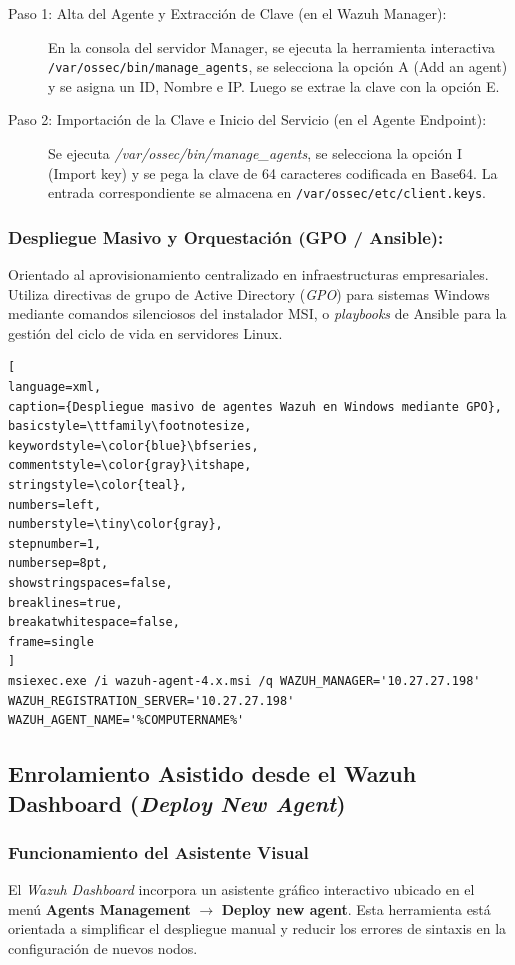 \begin{description}
\item[Paso 1: Alta del Agente y Extracción de Clave (en el Wazuh Manager):] En la consola del servidor Manager, se ejecuta la herramienta interactiva \texttt{/var/ossec/bin/manage\_agents}, se selecciona la opción A (Add an agent) y se asigna un ID, Nombre e IP. Luego se extrae la clave con la opción E.
\item[Paso 2: Importación de la Clave e Inicio del Servicio (en el Agente Endpoint):] Se ejecuta \textit{/var/ossec/bin/manage\_agents}, se selecciona la opción I (Import key) y se pega la clave de 64 caracteres codificada en Base64. La entrada correspondiente se almacena en \texttt{/var/ossec/etc/client.keys}.
\end{description}

\subsubsection{Despliegue Masivo y Orquestación (GPO / Ansible):}
Orientado al aprovisionamiento centralizado en infraestructuras empresariales. Utiliza directivas de grupo de Active Directory (\textit{GPO}) para sistemas Windows mediante comandos silenciosos del instalador MSI, o \textit{playbooks} de Ansible para la gestión del ciclo de vida en servidores Linux.

\begin{lstlisting}[
language=xml,
caption={Despliegue masivo de agentes Wazuh en Windows mediante GPO},
basicstyle=\ttfamily\footnotesize,
keywordstyle=\color{blue}\bfseries,
commentstyle=\color{gray}\itshape,
stringstyle=\color{teal},
numbers=left,
numberstyle=\tiny\color{gray},
stepnumber=1,
numbersep=8pt,
showstringspaces=false,
breaklines=true,
breakatwhitespace=false,
frame=single
]
msiexec.exe /i wazuh-agent-4.x.msi /q WAZUH_MANAGER='10.27.27.198' WAZUH_REGISTRATION_SERVER='10.27.27.198' WAZUH_AGENT_NAME='%COMPUTERNAME%'
\end{lstlisting}

\subsection{Enrolamiento Asistido desde el Wazuh Dashboard (\textit{Deploy New Agent})}

\subsubsection{Funcionamiento del Asistente Visual}
El \textit{Wazuh Dashboard} incorpora un asistente gráfico interactivo ubicado en el menú \textbf{Agents Management} $\rightarrow$ \textbf{Deploy new agent}. Esta herramienta está orientada a simplificar el despliegue manual y reducir los errores de sintaxis en la configuración de nuevos nodos.

